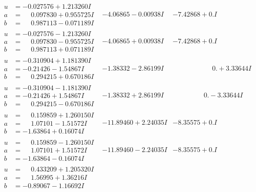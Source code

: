 \documentclass[1p]{elsarticle_modified}
\theoremstyle{definition}
\begin{document}
$$\begin{array}{c|c|c}
\begin{aligned}
u &= -0.027576 + 1.213260 I \\
a &= \phantom{-}0.097830 + 0.955725 I \\
b &= \phantom{-}0.987113 - 0.071189 I\end{aligned}
 & -4.06865 - 0.00938 I & -7.42868 + 0. I\phantom{ +0.000000I} \\ \hline\begin{aligned}
u &= -0.027576 - 1.213260 I \\
a &= \phantom{-}0.097830 - 0.955725 I \\
b &= \phantom{-}0.987113 + 0.071189 I\end{aligned}
 & -4.06865 + 0.00938 I & -7.42868 + 0. I\phantom{ +0.000000I} \\ \hline\begin{aligned}
u &= -0.310904 + 1.181390 I \\
a &= -0.21426 - 1.54867 I \\
b &= \phantom{-}0.294215 + 0.670186 I\end{aligned}
 & -1.38332 - 2.86199 I & \phantom{-0.000000 -}0. + 3.33644 I \\ \hline\begin{aligned}
u &= -0.310904 - 1.181390 I \\
a &= -0.21426 + 1.54867 I \\
b &= \phantom{-}0.294215 - 0.670186 I\end{aligned}
 & -1.38332 + 2.86199 I & \phantom{-0.000000 } 0. - 3.33644 I \\ \hline\begin{aligned}
u &= \phantom{-}0.159859 + 1.260150 I \\
a &= \phantom{-}1.07101 - 1.51572 I \\
b &= -1.63864 + 0.16074 I\end{aligned}
 & -11.89460 + 2.24035 I & -8.35575 + 0. I\phantom{ +0.000000I} \\ \hline\begin{aligned}
u &= \phantom{-}0.159859 - 1.260150 I \\
a &= \phantom{-}1.07101 + 1.51572 I \\
b &= -1.63864 - 0.16074 I\end{aligned}
 & -11.89460 - 2.24035 I & -8.35575 + 0. I\phantom{ +0.000000I} \\ \hline\begin{aligned}
u &= \phantom{-}0.433209 + 1.205320 I \\
a &= \phantom{-}1.56995 + 1.36216 I \\
b &= -0.89067 - 1.16692 I\end{aligned}

\end{array}$$
\end{document}
